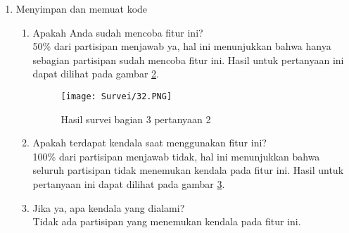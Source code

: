 \begin{enumerate}
\begin{enumerate}
            \begin{figure}[H]
        	\centering  
        	\texttt{[image: Survei/14.PNG]}  
        	\caption{Hasil survei bagian 2 pertanyaan 4}
        	\label{fig:5:survei24} 
        \end{figure}
        \item Apakah fitur ini sudah cukup nyaman untuk digunakan? \\ Rata-rata skor untuk pertanyaan ini adalah 4.25, dapat disimpulkan bahwa fitur ini sudah cukup nyaman untuk digunakan. Hasil untuk pertanyaan ini dapat dilihat pada gambar \ref{fig:5:survei24}.
        \item Apakah ada pendapat/saran/masukan untuk fitur ini? \\ Berikut ini adalah masukan yang didapatkan:
        \begin{itemize}
            \item Mengubah tampilan agar editor lebih mudah digunakan
        \end{itemize}
    \end{enumerate}
    \item Menyimpan dan memuat kode
    \begin{enumerate}
        \begin{figure}[H]
        	\centering  
        	\texttt{[image: Survei/31.PNG]}  
        	\caption{Hasil survei bagian 3 pertanyaan 1}
        	\label{fig:5:survei31} 
        \end{figure}
        \item Apakah Anda sudah mencoba fitur ini? \\ 50\% dari partisipan menjawab ya, hal ini menunjukkan bahwa hanya sebagian partisipan sudah mencoba fitur ini. Hasil untuk pertanyaan ini dapat dilihat pada gambar \ref{fig:5:survei31}.
        \begin{figure}[H]
        	\centering  
        	\texttt{[image: Survei/32.PNG]}  
        	\caption{Hasil survei bagian 3 pertanyaan 2}
        	\label{fig:5:survei32} 
        \end{figure}
        \item Apakah terdapat kendala saat menggunakan fitur ini? \\ 100\% dari partisipan menjawab tidak, hal ini menunjukkan bahwa seluruh partisipan tidak menemukan kendala pada fitur ini. Hasil untuk pertanyaan ini dapat dilihat pada gambar \ref{fig:5:survei32}.
        \item Jika ya, apa kendala yang dialami? \\ Tidak ada partisipan yang menemukan kendala pada fitur ini.

\end{enumerate}
\end{enumerate}
